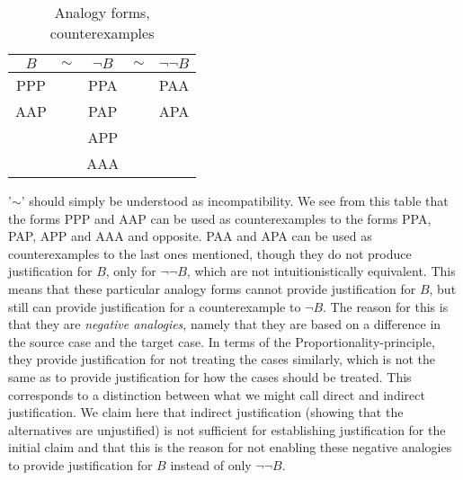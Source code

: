 				
					\begin{table}[h]
               		\centering
               		\begin{tabular}{c c c c c}
               			$B$  & $\sim$ & $\neg B$ & $\sim$ & $\neg \neg B$                                                                                                                                                                                                                                                                               \\ \toprule
               			PPP  && PPA && PAA \\
               			AAP  && PAP && APA \\
               				  && APP && \\
               				&&	AAA &&
						\\ \bottomrule
               		\end{tabular}
               		\caption{Analogy forms, counterexamples}
               		\label{AnalogyFormCounter}
					\end{table}				
				
				'$\sim$' should simply be understood as incompatibility. We see from this table that the forms PPP and AAP can be used as counterexamples to the forms PPA, PAP, APP and AAA and opposite. PAA and APA can be used as counterexamples to the last ones mentioned, though they do not produce justification for $B$, only for $\neg \neg B$, which are not intuitionistically equivalent. This means that these particular analogy forms cannot provide justification for $B$, but still can provide justification for a counterexample to $\neg B$. The reason for this is that they are \textit{negative analogies}, namely that they are based on a difference in the source case and the target case. In terms of the Proportionality-principle, they provide justification for not treating the cases similarly, which is not the same as to provide justification for how the cases should be treated. This corresponds to a distinction between what we might call direct and indirect justification. We claim here that indirect justification (showing that the alternatives are unjustified) is not sufficient for establishing justification for the initial claim and that this is the reason for not enabling these negative analogies to provide justification for $B$ instead of only $\neg \neg B$.  

